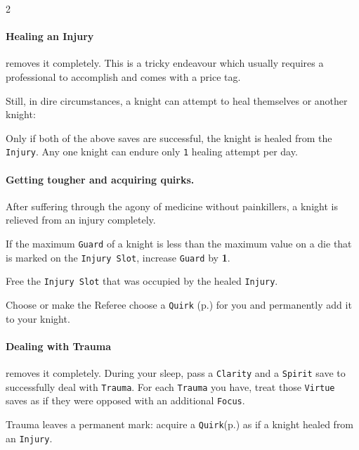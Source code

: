 \begin{multicols*}{2}
\paragraph{Healing an Injury} removes it completely.
This is a tricky endeavour which usually requires a professional to accomplish and comes with a price tag.

Still, in dire circumstances, a knight can attempt to heal themselves or another knight:

Only if both of the above saves are successful, the knight is healed from the \texttt{Injury}.
Any one knight can endure only \texttt{1} healing attempt per day.

\paragraph{Getting tougher and acquiring quirks.} After suffering through the agony of medicine without painkillers, a knight is relieved from an injury completely.

If the maximum \texttt{Guard} of a knight is less than the maximum value on a die that is marked on the \texttt{Injury Slot}, increase \texttt{Guard} by \textbf{1}.

Free the \texttt{Injury Slot} that was occupied by the healed \texttt{Injury}.

Choose or make the Referee choose a \texttt{Quirk} (p.\pageref*{sec:quirks}) for you and permanently add it to your knight.

\paragraph{Dealing with Trauma} removes it completely. 
During your sleep, pass a \texttt{Clarity} and a \texttt{Spirit} save to successfully deal with \texttt{Trauma}. 
For each \texttt{Trauma} you have, treat those \texttt{Virtue} saves as if they were opposed with an additional \texttt{Focus}.

Trauma leaves a permanent mark: acquire a \texttt{Quirk}(p.\pageref*{sec:quirks}) as if a knight healed from an \texttt{Injury}.



\end{multicols*}
